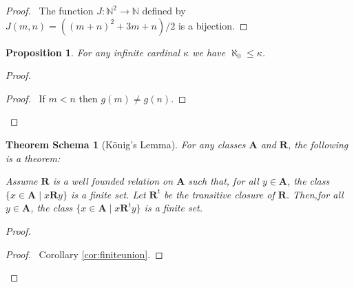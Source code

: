 \documentclass{book}
\let\qed\relax
\newtheorem{prop}[ax]{Proposition}
\newtheorem{thms}[ax]{Theorem Schema}
\theoremstyle{definition}
\begin{document}
\begin{proof}
\pf\ The function $J : \mathbb{N}^2 \rightarrow \mathbb{N}$ defined by $J(m,n) = ((m+n)^2 + 3m + n)/2$ is a bijection. \qed
\end{proof}

\begin{prop}
\label{prop:aleph0least}
For any infinite cardinal $\kappa$ we have $\aleph_0 \leq \kappa$.
\end{prop}

\begin{proof}
\pf
{}
\begin{proof}
	\pf\ If $m < n$ then $g(m) \neq g(n)$.
\end{proof}
\qed
\end{proof}

\begin{thms}[K\"{o}nig's Lemma]
For any classes $\mathbf{A}$ and $\mathbf{R}$, the following is a theorem:

Assume $\mathbf{R}$ is a well founded relation on $\mathbf{A}$ such that, for all $y \in \mathbf{A}$, the class $\{ x \in \mathbf{A} \mid x \mathbf{R} y \}$ is a finite set. Let $\mathbf{R}^t$ be the transitive closure of $\mathbf{R}$. Then,for all $y \in \mathbf{A}$, the class $\{ x \in \mathbf{A} \mid x \mathbf{R}^t y \}$ is a finite set.
\end{thms}

\begin{proof}
\pf
{}
\begin{proof}
	\pf\ Corollary \ref{cor:finiteunion}.
\end{proof}
\qed
\end{proof}
\end{document}
